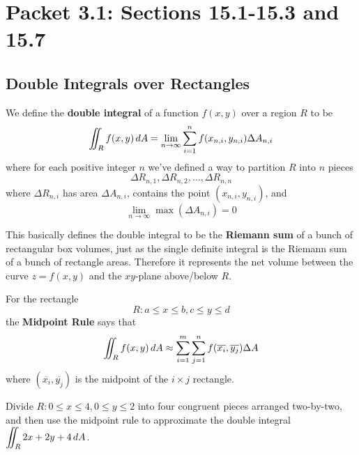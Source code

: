 \documentclass[letterpaper, twoside, 12pt]{book}
\begin{document}
\setcounter{chapter}{2}

\chapter{Packet 3.1: Sections 15.1-15.3 and 15.7}

\setcounter{chapter}{15}
\setcounter{section}{0}

\section{Double Integrals over Rectangles} %

\begin{definition}
  We define the \textbf{double integral} of a function $f(x,y)$
  over a region $R$ to be
    \[
      \iint_R f(x,y)\,d{A} =
      \lim_{n\to\infty}\sum_{i=1}^n f(x_{n,i},y_{n,i})\Delta A_{n,i}
    \]
  where for each positive integer $n$ we've defined a way to
  partition $R$ into $n$ pieces
    \[
      \Delta R_{n,1},\Delta R_{n,2},\dots,\Delta R_{n,n}
    \]
  where $\Delta R_{n,i}$ has area $\Delta A_{n,i}$, contains the
  point $(x_{n,i},y_{n,i})$, and
    \[
      \lim_{n\to\infty} \max(\Delta A_{n,i}) = 0
    \]
\end{definition}

\begin{remark}
  This basically defines the double integral to be the \textbf{Riemann sum}
  of a bunch of rectangular box volumes, just as the single definite integral
  is the Riemann sum of a bunch of rectangle areas. Therefore it represents
  the net volume between the curve $z=f(x,y)$ and the $xy$-plane above/below
  $R$.
\end{remark}

\begin{theorem}
  For the rectangle
  \[
    R: a\leq x\leq b, c\leq y\leq d
  \]
  the \textbf{Midpoint Rule} says that
  \[
    \iint_R f(x,y)\,d{A}
      \approx
    \sum_{i=1}^m\sum_{j=1}^n f(\overline{x_i},\overline{y_j}) \Delta A
  \]
  where $(\overline{x_i},\overline{y_j})$ is the midpoint of
  the $i\times j$ rectangle.
\end{theorem}

          \begin{problem}
            Divide $R : 0\leq x\leq 4, 0\leq y\leq 2 $
            into four congruent pieces arranged two-by-two,
            and then use the midpoint rule to approximate the double integral
            $\displaystyle\iint_R 2x+2y+4 \,d{A}$.
          \end{problem}
\end{document}
